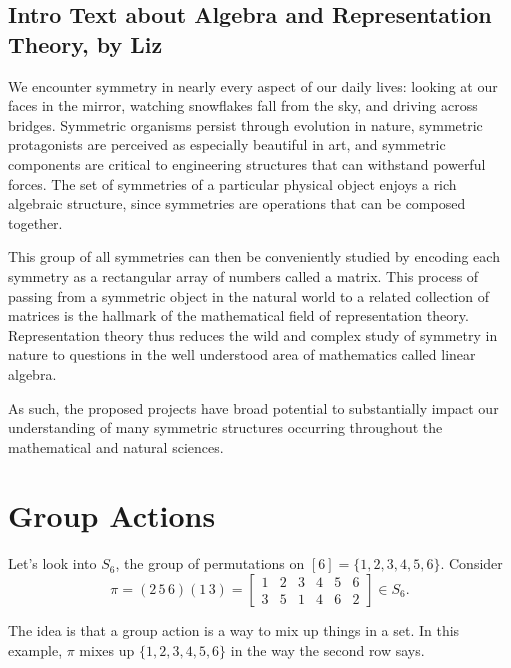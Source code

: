 \section*{Intro Text about Algebra and Representation Theory, by Liz}


We encounter symmetry in nearly every aspect of our daily lives: looking at our faces in the mirror, watching snowflakes fall from the sky, and driving across bridges. Symmetric organisms persist through evolution in nature, symmetric protagonists are perceived as especially beautiful in art, and symmetric components are critical to engineering structures that can withstand powerful forces. The set of symmetries of a particular physical object enjoys a rich algebraic structure, since symmetries are operations that can be composed together. 

This group of all symmetries can then be conveniently studied by encoding each symmetry as a rectangular array of numbers called a matrix. This process of passing from a symmetric object in the natural world to a related collection of matrices is the hallmark of the mathematical field of representation theory. Representation theory thus reduces the wild and complex study of symmetry in nature to questions in the well understood area of mathematics called linear algebra.

As such, the proposed projects have broad potential to substantially impact our understanding of many symmetric structures occurring throughout the mathematical and natural sciences. 

\chapter{Group Actions}

\begin{exmp}{}{}
  Let's look into \(S_6\), the group of permutations on \([6] = \{1, 2, 3, 4, 5, 6\}\).
  Consider \[ \pi = (2\,5\,6)(1\,3) = 
    \begin{bmatrix}
      1 & 2 & 3 & 4 & 5 & 6 \\
      3 & 5 & 1 & 4 & 6 & 2 
    \end{bmatrix} \in S_6.\]

    The idea is that a group action is a way to mix up things in a set. In this example, \(\pi\) mixes up \(\{1, 2, 3, 4, 5, 6\}\) in the way the second row says.
\end{exmp}

